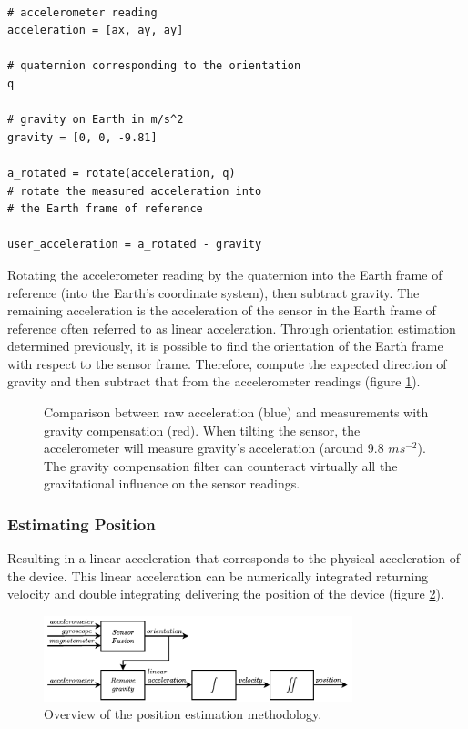 \lstset{language=Python}
\begin{lstlisting}[frame=single]  % Start your code-block
    
# accelerometer reading
acceleration = [ax, ay, ay]  

# quaternion corresponding to the orientation
q                            

# gravity on Earth in m/s^2
gravity = [0, 0, -9.81]      

a_rotated = rotate(acceleration, q) 
# rotate the measured acceleration into
# the Earth frame of reference

user_acceleration = a_rotated - gravity

\end{lstlisting}

Rotating the accelerometer reading by the quaternion into the Earth frame of reference (into the Earth’s coordinate system), then subtract gravity. The remaining acceleration is the acceleration of the sensor in the Earth frame of reference often referred to as linear acceleration. Through orientation estimation determined previously, it is possible to find the orientation of the Earth frame with respect to the sensor frame. Therefore, compute the expected direction of gravity and then subtract that from the accelerometer readings (figure \ref{fig:gavity_compensation}).

\begin{figure}[!h]
    \centering
    \resizebox{0.8\linewidth}{!}{}
    \caption{Comparison between raw acceleration (blue) and measurements with gravity compensation (red). When tilting the sensor, the accelerometer will measure gravity's acceleration (around 9.8 $ms^{-2}$). The gravity compensation filter can counteract virtually all the gravitational influence on the sensor readings.}
    \label{fig:gavity_compensation}
\end{figure}

\subsubsection{Estimating Position}

Resulting in a linear acceleration that corresponds to the physical acceleration of the device. This linear acceleration can be numerically integrated returning velocity and double integrating delivering the position of the device (figure \ref{fig:position_overview}).

\begin{figure}[!h]
    \centering
    \includegraphics[width=0.8\textwidth]{figures/orientation_position.pdf}
    \caption{Overview of the position estimation methodology.}
    \label{fig:position_overview}
\end{figure}

